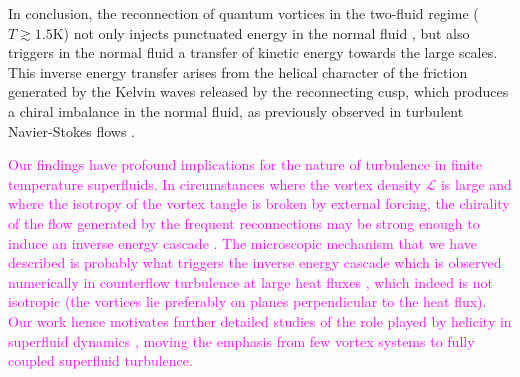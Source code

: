 \documentclass[%
 reprint,
 amsmath,amssymb,
 aps,
 prl,
]{revtex4-2}
\def\magenta#1{\textcolor{magenta}{#1}}
\begin{document}
{%
In conclusion, the reconnection of quantum vortices in the two-fluid regime
($T\gtrsim 1.5$K) not only injects punctuated
energy in the normal fluid \cite{stasiak2024quantum}, but also triggers in the normal fluid
a transfer of kinetic energy towards the large scales. 
This inverse energy transfer arises from the helical character of the
friction generated by the Kelvin waves released by the reconnecting
cusp, which produces a chiral imbalance in the normal fluid, as 
previously observed in turbulent Navier-Stokes flows
\cite{biferaleInverseEnergyCascade2012a,plunianInverseCascadeEnergy2020a}.

\magenta{
Our findings have profound implications for the nature of turbulence in 
finite temperature superfluids. In circumstances where the vortex density 
$\mathcal{L}$ is large and where the isotropy of the vortex tangle 
is broken by external forcing, the chirality of the flow generated by the 
frequent reconnections may be strong enough to induce an inverse energy 
cascade \cite{notes_recon}.
The microscopic mechanism that we have described is probably what
triggers the inverse energy cascade which is observed numerically in  
counterflow turbulence at large heat fluxes \cite{polanco2020}, which
indeed is not isotropic (the vortices lie preferably on planes 
perpendicular to the heat flux).
Our work hence motivates further detailed studies of
the role played by helicity in superfluid dynamics 
\cite{dileoni2016,galantucci2021},
moving the emphasis from few vortex systems \cite{scheeler2014} 
to fully coupled superfluid turbulence.}
 




}
\end{document}

